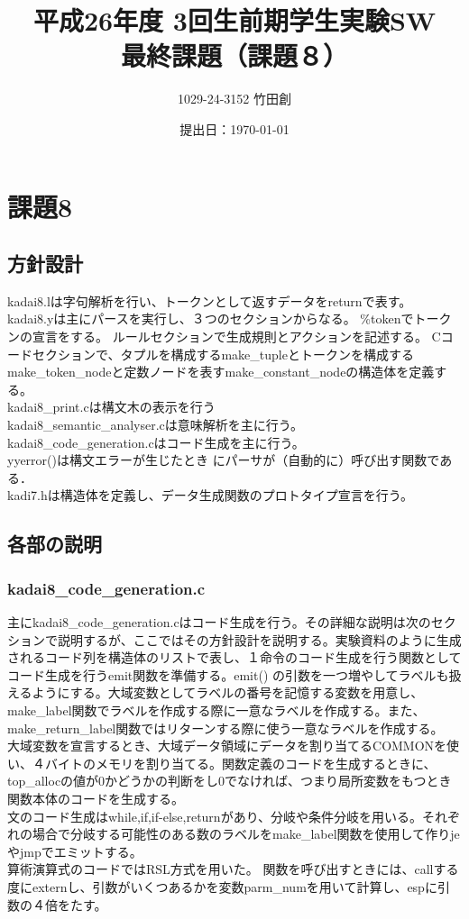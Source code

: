 \documentclass[a4paper,12pt]{jarticle}
\title{平成26年度 3回生前期学生実験SW \\最終課題（課題８） \\}
\author{1029-24-3152 竹田創}
\date{提出日：\today  }
\begin{document}
\maketitle

\section{課題8}
\lstset{numbers=left,basicstyle=\small}

\subsection{方針設計}
kadai8.lは字句解析を行い、トークンとして返すデータをreturnで表す。\\
kadai8.yは主にパースを実行し、３つのセクションからなる。
\%tokenでトークンの宣言をする。
ルールセクションで生成規則とアクションを記述する。
Cコードセクションで、タプルを構成するmake\_tupleとトークンを構成するmake\_token\_nodeと定数ノードを表すmake\_constant\_nodeの構造体を定義する。\\
kadai8\_print.cは構文木の表示を行う\\
kadai8\_semantic\_analyser.cは意味解析を主に行う。\\
kadai8\_code\_generation.cはコード生成を主に行う。\\
yyerror()は構文エラーが生じたとき
にパーサが（自動的に）呼び出す関数である．\\
kadi7.hは構造体を定義し、データ生成関数のプロトタイプ宣言を行う。

\subsection{各部の説明}

\subsubsection{kadai8\_code\_generation.c}
主にkadai8\_code\_generation.cはコード生成を行う。その詳細な説明は次のセクションで説明するが、ここではその方針設計を説明する。実験資料のように生成されるコード列を構造体のリストで表し、１命令のコード生成を行う関数としてコード生成を行うemit関数を準備する。emit() の引数を一つ増やしてラベルも扱えるようにする。大域変数としてラベルの番号を記憶する変数を用意し、make\_label関数でラベルを作成する際に一意なラベルを作成する。また、make\_return\_label関数ではリターンする際に使う一意なラベルを作成する。\\
大域変数を宣言するとき、大域データ領域にデータを割り当てるCOMMONを使い、４バイトのメモリを割り当てる。関数定義のコードを生成するときに、top\_allocの値が0かどうかの判断をし0でなければ、つまり局所変数をもつとき関数本体のコードを生成する。\\
文のコード生成はwhile,if,if-else,returnがあり、分岐や条件分岐を用いる。それぞれの場合で分岐する可能性のある数のラベルをmake\_label関数を使用して作りjeやjmpでエミットする。\\
算術演算式のコードではRSL方式を用いた。
関数を呼び出すときには、callする度にexternし、引数がいくつあるかを変数parm\_numを用いて計算し、espに引数の４倍をたす。
\end{document}
